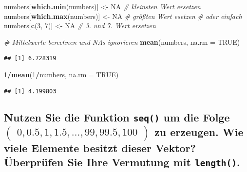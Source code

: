 \documentclass[12pt,a4paper]{article}
\newenvironment{Shaded}{\begin{snugshade}}{\end{snugshade}}
\newcommand{\AttributeTok}[1]{\textcolor[rgb]{0.13,0.29,0.53}{#1}}
\newcommand{\CommentTok}[1]{\textcolor[rgb]{0.56,0.35,0.01}{\textit{#1}}}
\newcommand{\ConstantTok}[1]{\textcolor[rgb]{0.56,0.35,0.01}{#1}}
\newcommand{\DecValTok}[1]{\textcolor[rgb]{0.00,0.00,0.81}{#1}}
\newcommand{\FunctionTok}[1]{\textcolor[rgb]{0.13,0.29,0.53}{\textbf{#1}}}
\newcommand{\NormalTok}[1]{#1}
\newcommand{\OtherTok}[1]{\textcolor[rgb]{0.56,0.35,0.01}{#1}}
\newcommand{\SpecialCharTok}[1]{\textcolor[rgb]{0.81,0.36,0.00}{\textbf{#1}}}
\begin{document}
\begin{Shaded}
\begin{Highlighting}[]
\NormalTok{    numbers[}\FunctionTok{which.min}\NormalTok{(numbers)] }\OtherTok{\textless{}{-}} \ConstantTok{NA}     \CommentTok{\# kleinsten Wert ersetzen}
\NormalTok{    numbers[}\FunctionTok{which.max}\NormalTok{(numbers)] }\OtherTok{\textless{}{-}} \ConstantTok{NA}     \CommentTok{\# größten Wert esetzen }
    \CommentTok{\# oder einfach }
\NormalTok{    numbers[}\FunctionTok{c}\NormalTok{(}\DecValTok{3}\NormalTok{, }\DecValTok{7}\NormalTok{)] }\OtherTok{\textless{}{-}} \ConstantTok{NA}                \CommentTok{\# 3. und 7. Wert ersetzen }
    
    \CommentTok{\# Mittelwerte berechnen und \textquotesingle{}NA\textquotesingle{}s ignorieren}
    \FunctionTok{mean}\NormalTok{(numbers, }\AttributeTok{na.rm =} \ConstantTok{TRUE}\NormalTok{)}
\end{Highlighting}
\end{Shaded}

\begin{verbatim}
## [1] 6.728319
\end{verbatim}

\begin{Shaded}
\begin{Highlighting}[]
    \DecValTok{1}\SpecialCharTok{/}\FunctionTok{mean}\NormalTok{(}\DecValTok{1}\SpecialCharTok{/}\NormalTok{numbers, }\AttributeTok{na.rm =} \ConstantTok{TRUE}\NormalTok{)}
\end{Highlighting}
\end{Shaded}

\begin{verbatim}
## [1] 4.199803
\end{verbatim}

\vspace{0.5cm}

\hypertarget{nutzen-sie-die-funktion-um-die-folge-beginpmatrix-0-0.5-1-1.5-ldots-99-99.5-100-endpmatrix-zu-erzeugen.-wie-viele-elemente-besitzt-dieser-vektor-uxfcberpruxfcfen-sie-ihre-vermutung-mit-.}{%
\subsection{\texorpdfstring{Nutzen Sie die Funktion \texttt{seq()} um
die Folge
\linebreak \(\begin{pmatrix} 0, 0.5, 1, 1.5, \ldots, 99, 99.5, 100 \end{pmatrix}\)
zu erzeugen. Wie viele Elemente besitzt dieser Vektor? Überprüfen Sie
Ihre Vermutung mit
\texttt{length()}.}{Nutzen Sie die Funktion  um die Folge \textbackslash begin\{pmatrix\} 0, 0.5, 1, 1.5, \textbackslash ldots, 99, 99.5, 100 \textbackslash end\{pmatrix\} zu erzeugen. Wie viele Elemente besitzt dieser Vektor? Überprüfen Sie Ihre Vermutung mit .}}\label{nutzen-sie-die-funktion-um-die-folge-beginpmatrix-0-0.5-1-1.5-ldots-99-99.5-100-endpmatrix-zu-erzeugen.-wie-viele-elemente-besitzt-dieser-vektor-uxfcberpruxfcfen-sie-ihre-vermutung-mit-.}}
\end{document}
